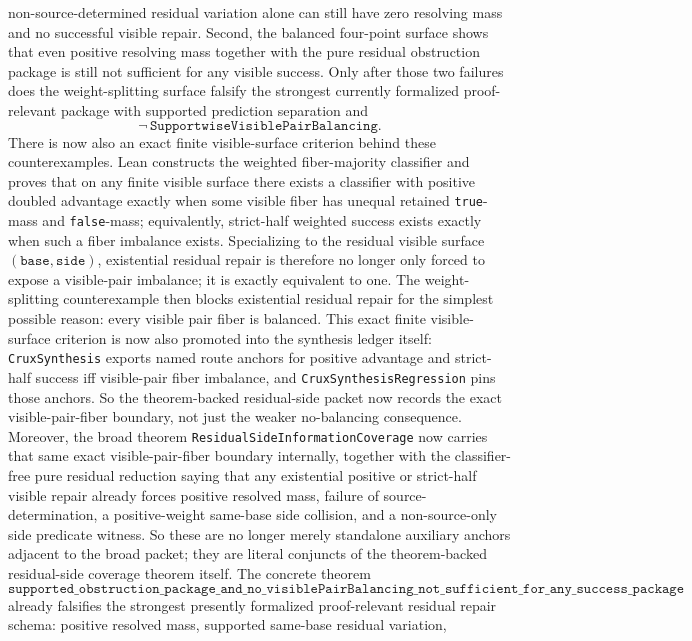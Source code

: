 \documentclass[11pt]{article}
\theoremstyle{remark}
\begin{document}
non-source-determined residual variation alone can still have zero resolving
mass and no successful visible repair.  Second, the balanced four-point
surface shows that even positive resolving mass together with the pure
residual obstruction package is still not sufficient for any visible
success.  Only after those two failures does the weight-splitting surface
falsify the strongest currently formalized proof-relevant package with
supported prediction separation and
\[
\neg\,\texttt{SupportwiseVisiblePairBalancing}.
\]
There is now also an exact finite visible-surface criterion behind these
counterexamples.  Lean constructs the weighted fiber-majority classifier and
proves that on any finite visible surface there exists a classifier with
positive doubled advantage exactly when some visible fiber has unequal retained
\texttt{true}-mass and \texttt{false}-mass; equivalently, strict-half weighted
success exists exactly when such a fiber imbalance exists.  Specializing to
the residual visible surface \((\texttt{base},\texttt{side})\), existential
residual repair is therefore no longer only forced to expose a visible-pair
imbalance; it is exactly equivalent to one.  The weight-splitting
counterexample then blocks existential residual repair for the simplest
possible reason: every visible pair fiber is balanced.  This exact finite
visible-surface criterion is now also promoted into the synthesis ledger
itself: \texttt{CruxSynthesis} exports named route anchors for positive
advantage and strict-half success iff visible-pair fiber imbalance, and
\texttt{CruxSynthesisRegression} pins those anchors.  So the theorem-backed
residual-side packet now records the exact visible-pair-fiber boundary, not
just the weaker no-balancing consequence.  Moreover, the broad theorem
\texttt{ResidualSideInformationCoverage} now carries that same exact
visible-pair-fiber boundary internally, together with the classifier-free
pure residual reduction saying that any existential positive or strict-half
visible repair already forces positive resolved mass, failure of
source-determination, a positive-weight same-base side collision, and a
non-source-only side predicate witness.  So these are no longer merely
standalone auxiliary anchors adjacent to the broad packet; they are literal
conjuncts of the theorem-backed residual-side coverage theorem itself.
The concrete theorem
\[
  \texttt{supported\_obstruction\_package\_and\_no\_visiblePairBalancing\_not\_sufficient\_for\_any\_success\_package}
\]
already falsifies the strongest presently formalized proof-relevant residual
repair schema: positive resolved mass, supported same-base residual variation,
\end{document}
